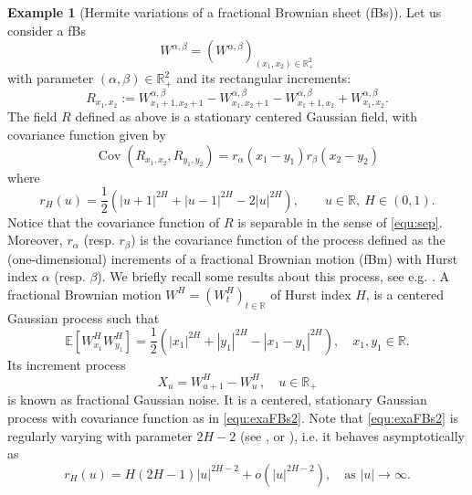 \documentclass[12pt]{article}
\DeclareMathOperator{\1}{1}
\DeclareMathOperator{\cov}{Cov}
\newcommand{\R}{\mathbb{R}}
\newcommand{\E}{\mathbb{E}}
\theoremstyle{plain}
\theoremstyle{definition}
\newtheorem{example}{Example}
\begin{document}
\begin{example}[Hermite variations of a fractional Brownian sheet (fBs)]\label{exa:fBs}
    Let us consider a fBs \begin{equation}
        W^{\alpha,\beta}=(W^{\alpha,\beta})_{(x_1,x_2)\in \R_+^2 }
    \end{equation}
    with parameter $(\alpha,\beta)\in \R_+^2$ and its rectangular increments: \begin{equation}\label{equ:exaFBs1}
        R_{x_1,x_2} := W^{\alpha,\beta}_{x_1+1,x_2+1}-W^{\alpha,\beta}_{x_1,x_2+1}-W^{\alpha,\beta}_{x_1+1,x_2}+W^{\alpha,\beta}_{x_1,x_2}.
    \end{equation}
    The field $R$ defined as above is a stationary centered Gaussian field, with covariance function given by \begin{equation}
        \cov(R_{x_1,x_2},R_{y_1,y_2}) =  r_\alpha(x_1-y_1) r_\beta(x_2-y_2)
    \end{equation}
    where \begin{equation}\label{equ:exaFBs2}
        r_H(u)=\frac{1}{2}\left(|u+1|^{2H}+|u-1|^{2H}-2|u|^{2H}\right), \quad \quad u\in\R, \ H\in(0,1).
    \end{equation}
    Notice that the covariance function of $R$ is separable in the sense of \eqref{equ:sep}. Moreover, $r_{\alpha}$ (resp. $r_{\beta}$) is the covariance function of the process defined as the (one-dimensional) increments of a fractional Brownian motion (fBm) with Hurst index $\alpha$ (resp. $\beta$). We briefly recall some results about this process, see e.g. \cite{bluebook}. A fractional Brownian motion $W^H=(W^H_t)_{t\in \R}$ of Hurst index $H$, is a centered Gaussian process such that \begin{equation}
            \E[W^H_{x_1}W^H_{y_1}] = \frac{1}{2}\left(|x_1|^{2H}+|y_1|^{2H}-|x_1-y_1|^{2H}\right), \quad x_1,y_1\in\R.
        \end{equation}
    Its increment process 
    \begin{equation}
            X_u=W^H_{u+1}-W^H_u, \quad u\in \R_+
        \end{equation}
    is known as fractional Gaussian noise. It is a centered, stationary Gaussian process with covariance function as in \eqref{equ:exaFBs2}. Note that \eqref{equ:exaFBs2} is regularly varying with parameter $2H-2$ (see \cite[(7.4.3)]{bluebook}, or \cite[Example 1]{M23}), i.e. it behaves asymptotically as \begin{equation}
            r_H(u)=H(2H-1)|u|^{2H-2} + o(|u|^{2H-2}), \quad \text{as } |u|\to\infty. 

\end{equation}
\end{example}
\end{document}
